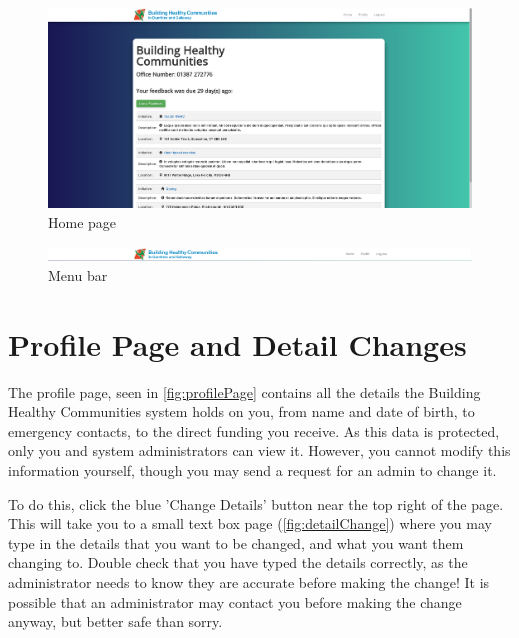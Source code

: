 \documentclass{bhcguides}
\begin{document}
\begin{figure}[h]
 \centerline{\includegraphics[width=\textwidth, height=\textheight, keepaspectratio]{homepage.png}}
 \caption{Home page}
 \label{fig:homePage}
\end{figure}

\begin{figure}[h]
 \centerline{\includegraphics[width=\textwidth, height=\textheight, keepaspectratio]{menubar.png}}
 \caption{Menu bar}
 \label{fig:menuBar}
\end{figure}

\pagebreak

\section{Profile Page and Detail Changes}
\label{sec:profile}

The profile page, seen in \autoref{fig:profilePage} contains all the details the Building Healthy Communities system holds on you, from name and date of birth, to emergency contacts, to the direct funding you receive. As this data is protected, only you and system administrators can view it. However, you cannot modify this information yourself, though you may send a request for an admin to change it. 

To do this, click the blue 'Change Details' button near the top right of the page. This will take you to a small text box page (\autoref{fig:detailChange}) where you may type in the details that you want to be changed, and what you want them changing to. Double check that you have typed the details correctly, as the administrator needs to know they are accurate before making the change! It is possible that an administrator may contact you before making the change anyway, but better safe than sorry.
\end{document}
